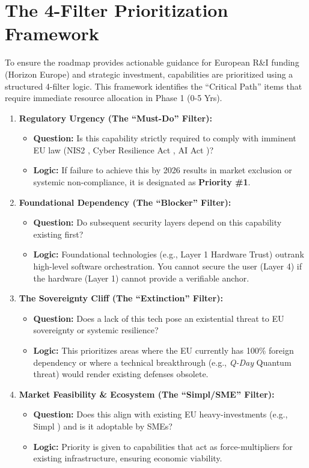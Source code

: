 \documentclass[12pt,a4paper]{article}
\begin{document}
\section{The 4-Filter Prioritization Framework}
To ensure the roadmap provides actionable guidance for European R\&I funding (Horizon Europe) and strategic investment, capabilities are prioritized using a structured 4-filter logic. This framework identifies the ``Critical Path'' items that require immediate resource allocation in Phase 1 (0-5 Yrs).

\begin{enumerate}
    \item \textbf{Regulatory Urgency (The ``Must-Do'' Filter):}
    \begin{itemize}
        \item \textbf{Question:} Is this capability strictly required to comply with imminent EU law (NIS2 \cite{nis2}, Cyber Resilience Act \cite{cra}, AI Act \cite{aiact})?
        \item \textbf{Logic:} If failure to achieve this by 2026 results in market exclusion or systemic non-compliance, it is designated as \textbf{Priority \#1}.
    \end{itemize}

    \item \textbf{Foundational Dependency (The ``Blocker'' Filter):}
    \begin{itemize}
        \item \textbf{Question:} Do subsequent security layers depend on this capability existing first?
        \item \textbf{Logic:} Foundational technologies (e.g., Layer 1 Hardware Trust) outrank high-level software orchestration. You cannot secure the user (Layer 4) if the hardware (Layer 1) cannot provide a verifiable anchor.
    \end{itemize}

    \item \textbf{The Sovereignty Cliff (The ``Extinction'' Filter):}
    \begin{itemize}
        \item \textbf{Question:} Does a lack of this tech pose an existential threat to EU sovereignty or systemic resilience?
        \item \textbf{Logic:} This prioritizes areas where the EU currently has 100\% foreign dependency or where a technical breakthrough (e.g., \textit{Q-Day} Quantum threat) would render existing defenses obsolete.
    \end{itemize}

    \item \textbf{Market Feasibility \& Ecosystem (The ``Simpl/SME'' Filter):}
    \begin{itemize}
        \item \textbf{Question:} Does this align with existing EU heavy-investments (e.g., Simpl \cite{cloud_edge_roadmap}) and is it adoptable by SMEs?
        \item \textbf{Logic:} Priority is given to capabilities that act as force-multipliers for existing infrastructure, ensuring economic viability.
    \end{itemize}
\end{enumerate}
\end{document}
